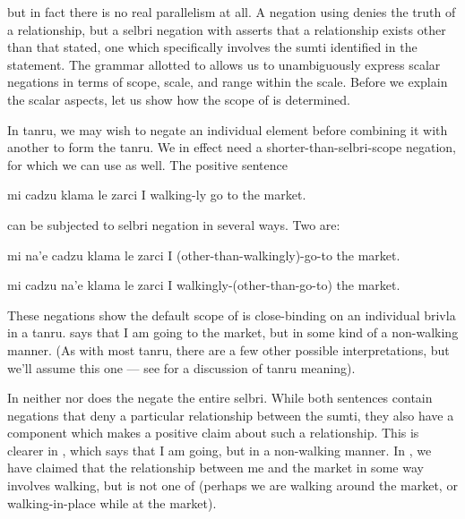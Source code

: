 {\noindent}but in fact there is no real parallelism at all. A negation
    using  denies the truth of a relationship, but a selbri
    negation with  asserts that a relationship exists other
    than that stated, one which specifically involves the sumti
    identified in the statement. The grammar allotted to 
    allows us to unambiguously express scalar negations in terms of
    scope, scale, and range within the scale. Before we explain the
    scalar aspects, let us show how the scope of  is
    determined. 

In tanru, we may wish to negate an individual element before
    combining it with another to form the tanru. We in effect need
    a shorter-than-selbri-scope negation, for which we can use
     as well. The positive sentence
\begin{example}
mi cadzu klama le zarci\n
I walking-ly go to the market.
\end{example}

{\noindent}can be subjected to selbri negation in several ways. Two are:
\begin{example}
mi na'e cadzu klama le zarci\n
I (other-than-walkingly)-go-to the market.
\end{example}

\begin{example}
mi cadzu na'e klama le zarci\n
I walkingly-(other-than-go-to) the market.
\end{example}

These negations show the default scope of  is
    close-binding on an individual brivla in a tanru.  says that I am going to the
    market, but in some kind of a non-walking manner. (As with most
    tanru, there are a few other possible interpretations, but
    we'll assume this one --- see  for a discussion of tanru meaning).

In neither  nor  does the  negate the
    entire selbri. While both sentences contain negations that deny
    a particular relationship between the sumti, they also have a
    component which makes a positive claim about such a
    relationship. This is clearer in , which says that I am going, but in a non-walking
    manner. In , we have claimed
    that the relationship between me and the market in some way
    involves walking, but is not one of  (perhaps we
    are walking around the market, or walking-in-place while at the
    market).

